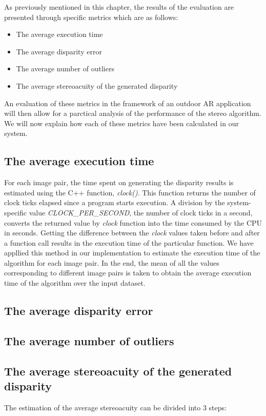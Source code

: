 As previously mentioned in this chapter, the results of the evaluation are presented through specific metrics which are as follows:

\begin{itemize}
\item{The average execution time}
\item{The average disparity error}
\item{The average number of outliers}
\item{The average stereoacuity of the generated disparity}
\end{itemize}

An evaluation of these metrics in the framework of an outdoor AR application will then allow for a parctical analysis of the performance of the stereo algorithm.
We will now explain how each of these metrics have been calculated in our system.

\subsection{The average execution time}
For each image pair, the time spent on generating the disparity results is estimated using the C++ function, \textit{clock()}. 
This function returns the number of clock ticks elapsed
since a program starts execution. A division by the system-specific value \textit{CLOCK\_PER\_SECOND}, the number of clock ticks in a second, 
converts the returned value by \textit{clock} function into the time consumed by the CPU in seconds.
Getting the difference between the \textit{clock} values taken before and after a function call results in the execution time
of the particular function. 
We have appllied this method in our implementation to estimate the execution time of the algorithm for each image pair. In the end, the mean of all
the values corresponding to different image pairs is taken to obtain the average execution time of the algorithm over the input dataset.

\subsection{The average disparity error}


\subsection{The average number of outliers}

\subsection{The average stereoacuity of the generated disparity}
The estimation of the average stereoacuity can be divided into 3 steps:

